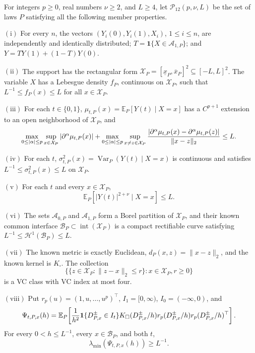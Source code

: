For integers \(p\geq0\), real numbers \(\nu\geq2\), and \(L\geq4\), let \(\mathcal P_{12}(p,\nu,L)\) be the set of laws \(P\) satisfying all the following member properties.

\(\mathrm{(i)}\) For every \(n\), the vectors \((Y_i(0),Y_i(1),X_i)\), \(1\leq i\leq n\), are independently and identically distributed; \(T=\mathbf 1\{X\in\mathcal A_{1,P}\}\); and \(Y=TY(1)+(1-T)Y(0)\).

\(\mathrm{(ii)}\) The support has the rectangular form \(\mathcal X_P=[\underline x_P,\overline x_P]^2\subseteq[-L,L]^2\).  The variable \(X\) has a Lebesgue density \(f_P\), continuous on \(\mathcal X_P\), such that \(L^{-1}\leq f_P(x)\leq L\) for all \(x\in\mathcal X_P\).

\(\mathrm{(iii)}\) For each \(t\in\{0,1\}\), \(\mu_{t,P}(x)=\mathbb E_P[Y(t)\mid X=x]\) has a \(C^{p+1}\) extension to an open neighborhood of \(\mathcal X_P\), and
\[
 \max_{0\leq|\alpha|\leq p}\sup_{x\in\mathcal X_P}|\partial^\alpha\mu_{t,P}(x)|
 +\max_{0\leq|\alpha|\leq p}\sup_{x\neq z\in\mathcal X_P}
 { |\partial^\alpha\mu_{t,P}(x)-\partial^\alpha\mu_{t,P}(z)|\over\lVert x-z\rVert_2}
 \leq L.
\]

\(\mathrm{(iv)}\) For each \(t\), \(\sigma^2_{t,P}(x)=\operatorname{Var}_P(Y(t)\mid X=x)\) is continuous and satisfies \(L^{-1}\leq\sigma^2_{t,P}(x)\leq L\) on \(\mathcal X_P\).

\(\mathrm{(v)}\) For each \(t\) and every \(x\in\mathcal X_P\),
\[
 \mathbb E_P[|Y(t)|^{2+\nu}\mid X=x]\leq L.
\]

\(\mathrm{(vi)}\) The sets \(\mathcal A_{0,P}\) and \(\mathcal A_{1,P}\) form a Borel partition of \(\mathcal X_P\), and their known common interface \(\mathcal B_P\subset\operatorname{int}(\mathcal X_P)\) is a compact rectifiable curve satisfying \(L^{-1}\leq\mathcal H^1(\mathcal B_P)\leq L\).

\(\mathrm{(vii)}\) The known metric is exactly Euclidean, \(d_P(x,z)=\lVert x-z\rVert_2\), and the known kernel is \(K_\square\).  The collection
\[
 \{\{z\in\mathcal X_P:\lVert z-x\rVert_2\leq r\}:x\in\mathcal X_P, r\geq0\}
\]
is a VC class with VC index at most four.

\(\mathrm{(viii)}\) Put \(r_p(u)=(1,u,\ldots,u^p)^\top\), \(I_1=[0,\infty)\), \(I_0=(-\infty,0)\), and
\[
 \Psi_{t,P,x}(h)=\mathbb E_P\!\left[
 {1\over h^2}\mathbf 1\{D^{\pm}_{P,x}\in I_t\}K_\square(D^{\pm}_{P,x}/h)
 r_p(D^{\pm}_{P,x}/h)r_p(D^{\pm}_{P,x}/h)^\top
 \right].
\]
For every \(0<h\leq L^{-1}\), every \(x\in\mathcal B_P\), and both \(t\),
\[
 \lambda_{\min}(\Psi_{t,P,x}(h))\geq L^{-1}.
\]

